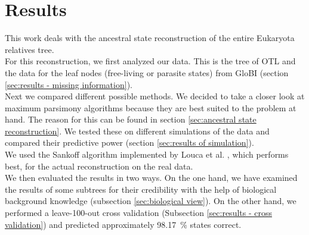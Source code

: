 \chapter{Results}
  This work deals with the ancestral state reconstruction of the entire Eukaryota relatives tree. \\

  For this reconstruction, we first analyzed our data. This is the tree of OTL \cite{Hinchliff2015}
    and the data for the leaf nodes (free-living or parasite states) from GloBI \cite{Poelen2014} 
    (section \ref{sec:results - missing information}). \\
  Next we compared different possible methods. We decided to take a closer look at maximum parsimony 
    algorithms because they are best suited to the problem at hand. The reason for this can be found 
    in section \ref{sec:ancestral state reconstruction}. We tested these on different simulations of 
    the data and compared their predictive power (section \ref{sec:results of simulation}). \\
  We used the Sankoff algorithm \cite{Sankoff1975} implemented by Louca et al. \cite{Louca2017}, 
    which performs best, for the actual reconstruction on the real data. \\

  We then evaluated the results in two ways. On the one hand, we have examined the results of some 
    subtrees for their credibility with the help of biological background knowledge (subsection 
    \ref{sec:biological view}). On the other hand, we performed a leave-100-out cross validation
    (Subsection \ref{sec:results - cross validation}) and predicted approximately 98.17~\% states 
    correct.

  
%    
